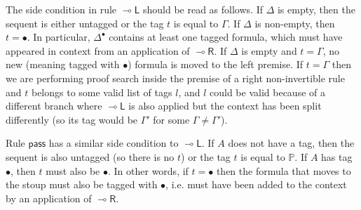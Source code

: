 \documentclass[submission,copyright,creativecommons]{eptcs}
\theoremstyle{definition}
\newcommand{\lright}{{\multimap}\mathsf{R}}
\newcommand{\lleft}{{\multimap}\mathsf{L}}
\newcommand{\pass}{\mathsf{pass}}
\newcommand{\tP}{\mathbb{P}}
\begin{document}
The side condition in rule $\lleft$ should be read as follows. If $\Delta$ is empty, then the sequent is either untagged or the tag $t$ is equal to $ \Gamma$. If $\Delta$ is non-empty, then $t = \bullet$. In particular,
$\Delta^\bullet$ contains at least one tagged formula, which must have appeared in context from an application of $\lright$. If $\Delta$ is empty and $t = \Gamma$, no new (meaning tagged with $\bullet$) formula is moved to the left premise. If $t = \Gamma$ then we are performing proof search inside the premise of a right non-invertible rule and $t$ belongs to some valid list of tags $l$, and $l$ could be valid because of a different branch where $\lleft$ is also applied but the context has been split differently (so its tag would be $ \Gamma'$ for some $\Gamma \not= \Gamma'$).

Rule $\pass$ has a similar side condition to $\lleft$. If $A$ does not have a tag, then the sequent is also untagged (so there is no $t$) or the tag $t$ is equal to $\tP$. If $A$ has tag $\bullet$, then $t$ must also be $\bullet$. In other words, if $t = \bullet$ then the formula that moves to the stoup must also be tagged with $\bullet$, i.e. must have been added to the context by an application of $\lright$.
\end{document}
